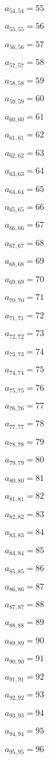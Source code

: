 \documentclass[a4paper,12pt]{article}
\begin{document}
$a _{ 54, 54 } = 55$

$a _{ 55, 55 } = 56$

$a _{ 56, 56 } = 57$

$a _{ 57, 57 } = 58$

$a _{ 58, 58 } = 59$

$a _{ 59, 59 } = 60$

$a _{ 60, 60 } = 61$

$a _{ 61, 61 } = 62$

$a _{ 62, 62 } = 63$

$a _{ 63, 63 } = 64$

$a _{ 64, 64 } = 65$

$a _{ 65, 65 } = 66$

$a _{ 66, 66 } = 67$

$a _{ 67, 67 } = 68$

$a _{ 68, 68 } = 69$

$a _{ 69, 69 } = 70$

$a _{ 70, 70 } = 71$

$a _{ 71, 71 } = 72$

$a _{ 72, 72 } = 73$

$a _{ 73, 73 } = 74$

$a _{ 74, 74 } = 75$

$a _{ 75, 75 } = 76$

$a _{ 76, 76 } = 77$

$a _{ 77, 77 } = 78$

$a _{ 78, 78 } = 79$

$a _{ 79, 79 } = 80$

$a _{ 80, 80 } = 81$

$a _{ 81, 81 } = 82$

$a _{ 82, 82 } = 83$

$a _{ 83, 83 } = 84$

$a _{ 84, 84 } = 85$

$a _{ 85, 85 } = 86$

$a _{ 86, 86 } = 87$

$a _{ 87, 87 } = 88$

$a _{ 88, 88 } = 89$

$a _{ 89, 89 } = 90$

$a _{ 90, 90 } = 91$

$a _{ 91, 91 } = 92$

$a _{ 92, 92 } = 93$

$a _{ 93, 93 } = 94$

$a _{ 94, 94 } = 95$

$a _{ 95, 95 } = 96$
\end{document}
